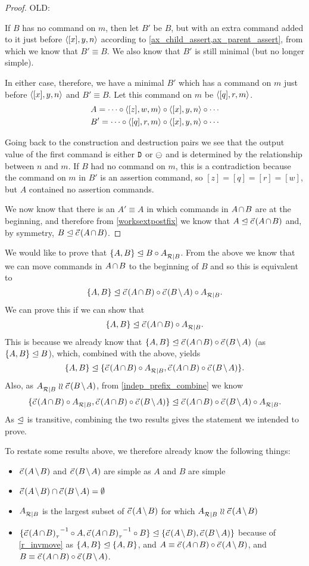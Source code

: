 \begin{proof}
OLD:

If $B$ has no command on $m$, then let $B'$ be $B$, 
but with an extra command added to it just before $\langle{[x],y,n}\rangle$
according to \cref{ax_child_assert,ax_parent_assert}, 
from which we know that $B'\equiv B$.
We also know that $B'$ is still minimal (but no longer simple).

In either case, therefore,
we have a minimal $B'$ which has a command on $m$ just before $\langle{[x],y,n}\rangle$ and $B'\equiv B$.
Let this command on $m$ be $\langle{[q],r,m}\rangle$.
\begin{gather*}
A = \cdots\circ  \langle{[z],w,m}\rangle\circ  \langle{[x],y,n}\rangle\circ  \cdots \\
B' = \cdots\circ  \langle{[q],r,m}\rangle\circ  \langle{[x],y,n}\rangle\circ  \cdots
\end{gather*}


Going back to the construction and destruction pairs we see that the output value of the first command
is either $\mathtt{D}$ or $\ominus$ and is determined by the relationship between $n$ and $m$.
If $B$ had no command on $m$,
this is a contradiction because the command on $m$ in $B'$ is an assertion command, so $[z]=[q]=[r]=[w]$, 
but $A$ contained no assertion commands.

We now know that there is an $A'\equiv A$ in which commands in $\acbnp$
are at the beginning, and therefore 
from \cref{worksextpostfix} we know that
$\worksm{A}{\acb}$ and, by symmetry, $\worksm{B}{\acb}$.
\end{proof}

\bigskip


\noindent
We would like to prove that ${\{{A,B}\}}\trianglelefteq{B\circ{A}^{}_{\mathcal{R}|{B}}}$.
From the above we know that we can move commands in $\acbnp$
to the beginning of $B$ and so this is equivalent to
\[ \worksmbx{A,B}{\acb\cc \bma\cc \reca}. \]
We can prove this if we can show that
\[ \worksmbx{A,B}{\acb\cc \reca}. \]
This is because we already know
that $\worksmbx{A,B}{\acb\cc \bma}$ (as ${\{{A,B}\}}\trianglelefteq{B}$),
which, combined with the above, yields
\[ \worksmbb{A,B}{\acb\cc \reca, \acb\cc \bma}. \]
Also, as $\reca\indep\bma$,
from \cref{indep_prefix_combine}
we know
\[ \worksmbx{\acb\cc \reca, \acb\cc \bma}{\acb\cc \bma\cc \reca}. \]
As $\trianglelefteq$ is transitive, combining the two results
gives the statement we intended to prove.


To restate some results above, we therefore already know the following things:
\begin{itemize}
\item $\amb$ and $\bma$ are simple as $A$ and $B$ are simple
\item $\amb \cap \bma = \emptyset$
\item ${A}^{}_{\mathcal{R}|{B}}$ is the largest subset of $\amb$ for which $\reca\indep\amb$
\item $\worksmbb{\acbi\cc A,\acbi\cc B}{\amb, \bma}$ 
because of \cref{r_invmove}
as ${\{{A,B}\}}\trianglelefteq{\{{A,B}\}}$,
and $A\equiv\acb\cc\amb$, and $B\equiv\acb\cc\bma$.
\end{itemize}

